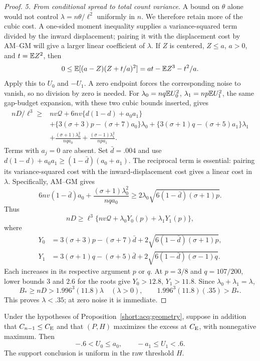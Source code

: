 \begin{proof}
\emph{5. From conditional spread to total count variance.}
A bound on $\theta$ alone would not control $\lambda=n\theta/\ell^2$
uniformly in $n$. We therefore retain more of the cubic cost. A
one-sided moment inequality supplies a variance-squared term divided by
the inward displacement; pairing it with the displacement cost by
AM--GM will give a larger linear coefficient of $\lambda$.
If $Z$ is centered, $Z\le a$, $a>0$, and $t=\mathbb E Z^2$, then
\[
 0\le\mathbb E[(a-Z)(Z+t/a)^2]=at-\mathbb E Z^3-t^2/a.
\]
Apply this to $U_0$ and $-U_1$. A zero endpoint forces the corresponding
noise to vanish, so no division by zero is needed. For
$\lambda_0=nq\mathbb E U_0^2$, $\lambda_1=np\mathbb E U_1^2$,
the same gap-budget expansion, with these two cubic bounds inserted, gives
\begin{align*}
 nD/\ell^3\ge{}&nv\mathcal Q+6nv\{d(1-d)+a_0a_1\}\\
 &+\{3(\sigma+3)p-(\sigma+7)a_0\}\lambda_0
  +\{3(\sigma+1)q-(\sigma+5)a_1\}\lambda_1\\
 &+\frac{(\sigma+1)\lambda_0^2}{nqa_0}
  +\frac{(\sigma-1)\lambda_1^2}{npa_1}.
\end{align*}
Terms with $a_j=0$ are absent. Set $\bar d=.004$ and use
$d(1-d)+a_0a_1\ge(1-\bar d)(a_0+a_1)$.
The reciprocal term is essential: pairing its variance-squared cost
with the inward-displacement cost gives a linear cost in $\lambda$.
Specifically, AM--GM gives
\[
 6nv(1-\bar d)a_0+
 \frac{(\sigma+1)\lambda_0^2}{nqa_0}
 \ge2\lambda_0\sqrt{6(1-\bar d)(\sigma+1)p}.
\]
Thus
\begin{equation}\label{short:acq:cubic-budget}
 nD\ge\ell^3\{nv\mathcal Q+\lambda_0Y_0(p)+\lambda_1Y_1(p)\},
\end{equation}
where
\begin{align*}
 Y_0&=3(\sigma+3)p-(\sigma+7)\bar d
                   +2\sqrt{6(1-\bar d)(\sigma+1)p},\\
 Y_1&=3(\sigma+1)q-(\sigma+5)\bar d
                   +2\sqrt{6(1-\bar d)(\sigma-1)q}.
\end{align*}
Each increases in its respective argument $p$ or $q$. At $p=3/8$ and
$q=107/200$, lower bounds $3$ and $2.6$ for the roots give
$Y_0>12.8$, $Y_1>11.8$. Since $\lambda_0+\lambda_1=\lambda$,
\[
 B_*\ge nD>1.996^3(11.8)\lambda
 \quad(\lambda>0),\qquad
 1.996^3(11.8)(.35)>B_*.
\]
This proves $\lambda<.35$; at zero noise it is immediate.
\end{proof}

\begin{proposition}\label{short:acq:strip}
Under the hypotheses of Proposition~\ref{short:acq:geometry}, suppose
in addition that $C_{n-1}\le C_{\mathrm E}$ and that $(P,H)$ maximizes the excess
at $C_{\mathrm E}$, with nonnegative maximum. Then
\[
                -.6<U_0\le a_0,\qquad -a_1\le U_1<.6.
\]
The support conclusion is uniform in the raw threshold $H$.
\end{proposition}

